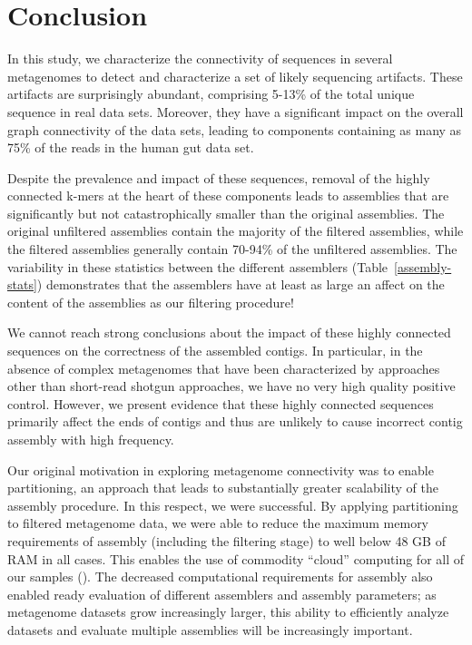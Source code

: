 \documentclass[10pt]{article}
\begin{document}
\section*{Conclusion}

In this study, we characterize the connectivity of sequences in
several metagenomes to detect and characterize a set of likely
sequencing artifacts.  These artifacts are surprisingly abundant,
comprising 5-13\% of the total unique sequence in real data sets.
Moreover, they have a significant impact on the overall graph
connectivity of the data sets, leading to components containing as
many as 75\% of the reads in the human gut data set.

Despite the prevalence and impact of these sequences, removal of the
highly connected k-mers at the heart of these components leads to
assemblies that are significantly but not catastrophically smaller
than the original assemblies.  The original unfiltered assemblies
contain the majority of the filtered assemblies, while the filtered
assemblies generally contain 70-94\% of the unfiltered assemblies.
The variability in these statistics between the different assemblers
(Table~\ref{assembly-stats}) demonstrates that the assemblers have at least as large an
affect on the content of the assemblies as our filtering procedure!

We cannot reach strong conclusions about the impact of these highly
connected sequences on the correctness of the assembled contigs.  In
particular, in the absence of complex metagenomes that have been
characterized by approaches other than short-read shotgun approaches,
we have no very high quality positive control.  However, we present
evidence that these highly connected sequences primarily affect the
ends of contigs and thus are unlikely to cause incorrect contig
assembly with high frequency.

Our original motivation in exploring metagenome connectivity was to
enable partitioning, an approach that leads to substantially greater
scalability of the assembly procedure.  In this respect, we were successful.
By applying partitioning to filtered metagenome data, we were able to
reduce the maximum memory requirements of assembly (including the
filtering stage) to well below 48 GB of RAM in all cases.  This
enables the use of commodity ``cloud'' computing for all of our
samples (\cite{Angiuoli:2011hd}).  The decreased computational
requirements for assembly also enabled ready evaluation of different
assemblers and assembly parameters; as metagenome datasets grow
increasingly larger, this ability to efficiently analyze datasets and
evaluate multiple assemblies will be increasingly important.
\end{document}
